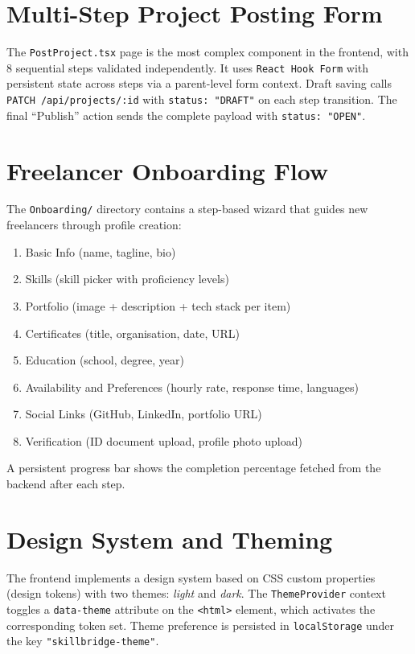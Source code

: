 \section{Multi-Step Project Posting Form}

The \texttt{PostProject.tsx} page is the most complex component in the frontend, with 8 sequential steps validated independently. It uses \texttt{React Hook Form} with persistent state across steps via a parent-level form context. Draft saving calls \texttt{PATCH /api/projects/:id} with \texttt{status: "DRAFT"} on each step transition. The final ``Publish'' action sends the complete payload with \texttt{status: "OPEN"}.

\section{Freelancer Onboarding Flow}

The \texttt{Onboarding/} directory contains a step-based wizard that guides new freelancers through profile creation:

\begin{enumerate}
  \item Basic Info (name, tagline, bio)
  \item Skills (skill picker with proficiency levels)
  \item Portfolio (image + description + tech stack per item)
  \item Certificates (title, organisation, date, URL)
  \item Education (school, degree, year)
  \item Availability and Preferences (hourly rate, response time, languages)
  \item Social Links (GitHub, LinkedIn, portfolio URL)
  \item Verification (ID document upload, profile photo upload)
\end{enumerate}

A persistent progress bar shows the completion percentage fetched from the backend after each step.

\section{Design System and Theming}

The frontend implements a design system based on CSS custom properties (design tokens) with two themes: \textit{light} and \textit{dark}. The \texttt{ThemeProvider} context toggles a \texttt{data-theme} attribute on the \texttt{<html>} element, which activates the corresponding token set. Theme preference is persisted in \texttt{localStorage} under the key \texttt{"skillbridge-theme"}.


